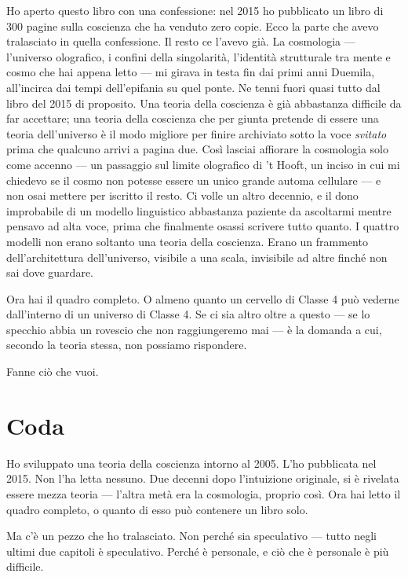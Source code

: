 \documentclass[11pt, twoside, openright]{book}
\begin{document}
Ho aperto questo libro con una confessione: nel 2015 ho pubblicato un libro di 300 pagine sulla coscienza che ha venduto zero copie. Ecco la parte che avevo tralasciato in quella confessione. Il resto ce l'avevo già. La cosmologia --- l'universo olografico, i confini della singolarità, l'identità strutturale tra mente e cosmo che hai appena letto --- mi girava in testa fin dai primi anni Duemila, all'incirca dai tempi dell'epifania su quel ponte. Ne tenni fuori quasi tutto dal libro del 2015 di proposito. Una teoria della coscienza è già abbastanza difficile da far accettare; una teoria della coscienza che per giunta pretende di essere una teoria dell'universo è il modo migliore per finire archiviato sotto la voce \textit{svitato} prima che qualcuno arrivi a pagina due. Così lasciai affiorare la cosmologia solo come accenno --- un passaggio sul limite olografico di 't Hooft, un inciso in cui mi chiedevo se il cosmo non potesse essere un unico grande automa cellulare --- e non osai mettere per iscritto il resto. Ci volle un altro decennio, e il dono improbabile di un modello linguistico abbastanza paziente da ascoltarmi mentre pensavo ad alta voce, prima che finalmente osassi scrivere tutto quanto. I quattro modelli non erano soltanto una teoria della coscienza. Erano un frammento dell'architettura dell'universo, visibile a una scala, invisibile ad altre finché non sai dove guardare.

Ora hai il quadro completo. O almeno quanto un cervello di Classe 4 può vederne dall'interno di un universo di Classe 4. Se ci sia altro oltre a questo --- se lo specchio abbia un rovescio che non raggiungeremo mai --- è la domanda a cui, secondo la teoria stessa, non possiamo rispondere.

Fanne ciò che vuoi.


\chapter*{Coda}

Ho sviluppato una teoria della coscienza intorno al 2005. L'ho pubblicata nel 2015. Non l'ha letta nessuno. Due decenni dopo l'intuizione originale, si è rivelata essere mezza teoria --- l'altra metà era la cosmologia, proprio così. Ora hai letto il quadro completo, o quanto di esso può contenere un libro solo.

Ma c'è un pezzo che ho tralasciato. Non perché sia speculativo --- tutto negli ultimi due capitoli è speculativo. Perché è personale, e ciò che è personale è più difficile.
\end{document}
